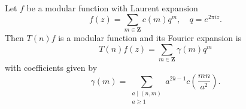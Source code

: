 Let $f$ be a modular function with Laurent expansion
$$f(z) = \sum_{m \in \mathbf{Z}} c(m)q^m, \quad q = e^{2\pi iz}.$$
Then $T(n)f$ is a modular function and its Fourier expansion is
$$T(n)f(z) = \sum_{m \in \mathbf{Z}} \gamma(m)q^m$$
with coefficients given by
$$\gamma(m) = \sum_{\substack{a \mid (n, m) \\ a \geq 1}} a^{2k-1}c\left(\frac{mn}{a^2}\right).$$
